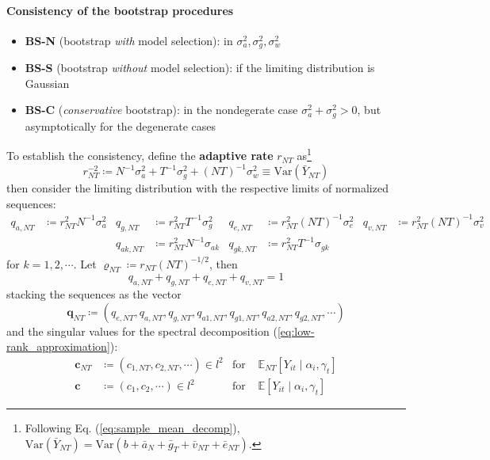 \documentclass[twoside]{article}
\begin{document}
\paragraph*{Consistency of the bootstrap procedures}
\begin{itemize}
    \item {\textbf{BS-N}} (bootstrap \textit{with} model selection):  in $\sigma^2_a,\sigma^2_g,\sigma^2_w$
    \item {\textbf{BS-S}} (bootstrap \textit{without} model selection):  if the limiting distribution is Gaussian
    \item {\textbf{BS-C}} (\textit{conservative} bootstrap):  in the nondegerate case $\sigma^2_a + \sigma^2_g >0$, but asymptotically  for the degenerate cases
\end{itemize}
To establish the consistency, define the \textbf{adaptive rate} $r_{NT}$ as\footnote{Following Eq. (\ref{eq:sample_mean_decomp}), $\mathrm{Var}(\bar{Y}_{NT}) = \mathrm{Var}(b+\bar{a}_N +\bar{g}_T + \bar{v}_{NT} + \bar{e}_{NT})$.}
\begin{equation*}
    r^{-2}_{NT} \coloneq N^{-1}\sigma^2_a + T^{-1}\sigma^2_g + (NT)^{-1}\sigma^2_w \equiv \mathrm{Var}(\bar{Y}_{NT})
\end{equation*}
then consider the limiting distribution with the respective limits of normalized sequences:
\begin{align}\label{eq:normalized_variances}
    q_{a,NT} &\coloneq r^2_{NT}N^{-1}\sigma^2_a & q_{g,NT} &\coloneq r^2_{NT}T^{-1}\sigma^2_g & q_{e,NT} &\coloneq r^2_{NT}(NT)^{-1}\sigma^2_e & q_{v,NT} &\coloneq r^2_{NT}(NT)^{-1}\sigma^2_v \\
    & & q_{ak,NT} & \coloneq r^2_{NT}N^{-1}\sigma_{ak} & q_{gk,NT} &\coloneq r^2_{NT}T^{-1}\sigma_{gk}\nonumber
\end{align}
for $k=1,2,\cdots$. Let $\varrho_{NT} \coloneq r_{NT}\left(NT\right)^{-1/2}$, then 
$$
q_{a,NT} + q_{g,NT} + q_{e,NT} + q_{v,NT} = 1
$$
stacking the sequences as the vector
$$
\mathbf{q}_{NT} \coloneq \left( q_{e,NT},q_{a,NT},q_{g,NT}, q_{a1,NT},q_{g1,NT}, q_{a2,NT},q_{g2,NT},\cdots \right)
$$
and the singular values for the spectral decomposition (\ref{eq:low-rank_approximation}):
\begin{align*}
    \mathbf{c}_{NT} &\coloneq \left(c_{1,NT},c_{2,NT},\cdots\right) \in l^2 & \text{for }&\mathbb{E}_{NT}\left[Y_{it}\mid \alpha_i,\gamma_t\right]\\
    \mathbf{c} &\coloneq \left(c_1,c_2,\cdots\right) \in l^2 & \text{for }&\mathbb{E}\left[Y_{it}\mid \alpha_i,\gamma_t\right]
\end{align*}
\end{document}
